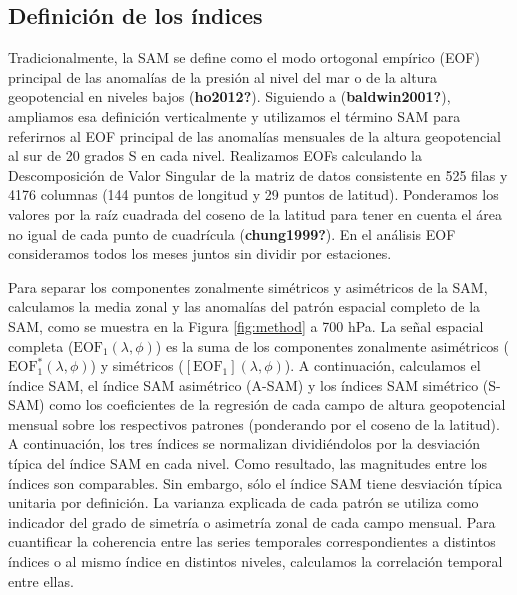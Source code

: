 \documentclass[12pt,oneside]{reedthesis}
\begin{document}
\hypertarget{definiciuxf3n-de-los-uxedndices}{%
\subsection{Definición de los índices}\label{definiciuxf3n-de-los-uxedndices}}

Tradicionalmente, la SAM se define como el modo ortogonal empírico (EOF) principal de las anomalías de la presión al nivel del mar o de la altura geopotencial en niveles bajos (\textbf{ho2012?}).
Siguiendo a (\textbf{baldwin2001?}), ampliamos esa definición verticalmente y utilizamos el término SAM para referirnos al EOF principal de las anomalías mensuales de la altura geopotencial al sur de 20 grados S en cada nivel.
Realizamos EOFs calculando la Descomposición de Valor Singular de la matriz de datos consistente en 525 filas y 4176 columnas (144 puntos de longitud y 29 puntos de latitud).
Ponderamos los valores por la raíz cuadrada del coseno de la latitud para tener en cuenta el área no igual de cada punto de cuadrícula (\textbf{chung1999?}).
En el análisis EOF consideramos todos los meses juntos sin dividir por estaciones.

Para separar los componentes zonalmente simétricos y asimétricos de la SAM, calculamos la media zonal y las anomalías del patrón espacial completo de la SAM, como se muestra en la Figura \ref{fig:method} a 700 hPa.
La señal espacial completa (\(\mathrm{EOF_1}(\lambda, \phi)\)) es la suma de los componentes zonalmente asimétricos (\(\mathrm{EOF_1^*}(\lambda, \phi)\)) y simétricos (\([\mathrm{EOF_1}](\lambda, \phi)\)).
A continuación, calculamos el índice SAM, el índice SAM asimétrico (A\nobreakdash-SAM) y los índices SAM simétrico (S\nobreakdash-SAM) como los coeficientes de la regresión de cada campo de altura geopotencial mensual sobre los respectivos patrones (ponderando por el coseno de la latitud).
A continuación, los tres índices se normalizan dividiéndolos por la desviación típica del índice SAM en cada nivel.
Como resultado, las magnitudes entre los índices son comparables.
Sin embargo, sólo el índice SAM tiene desviación típica unitaria por definición.
La varianza explicada de cada patrón se utiliza como indicador del grado de simetría o asimetría zonal de cada campo mensual.
Para cuantificar la coherencia entre las series temporales correspondientes a distintos índices o al mismo índice en distintos niveles, calculamos la correlación temporal entre ellas.
\end{document}
